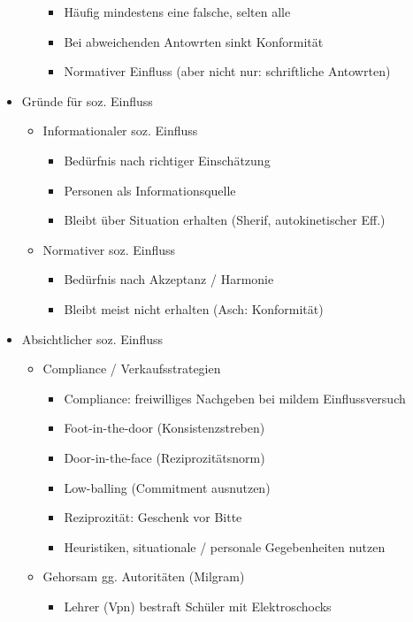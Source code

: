 \documentclass[11pt, paper=a4, twocolumn]{scrartcl}
\begin{document}
\begin{itemize}
\begin{itemize}
\begin{itemize}
							\item Häufig mindestens eine falsche, selten alle
							\item Bei abweichenden Antowrten sinkt Konformität
							\item Normativer Einfluss (aber nicht nur: schriftliche Antowrten)
						\end{itemize}
				\end{itemize}
			\item Gründe für soz. Einfluss
				\begin{itemize}
					\item Informationaler soz. Einfluss
						\begin{itemize}
							\item Bedürfnis nach richtiger Einschätzung
							\item Personen als Informationsquelle
							\item Bleibt über Situation erhalten (Sherif, autokinetischer Eff.)
						\end{itemize}
					\item Normativer soz. Einfluss
						\begin{itemize}
							\item Bedürfnis nach Akzeptanz / Harmonie
							\item Bleibt meist nicht erhalten (Asch: Konformität)
						\end{itemize}
				\end{itemize}
			\item Absichtlicher soz. Einfluss
				\begin{itemize}
					\item Compliance / Verkaufsstrategien
						\begin{itemize}
							\item Compliance: freiwilliges Nachgeben bei mildem Einflussversuch
							\item Foot-in-the-door (Konsistenzstreben)
							\item Door-in-the-face (Reziprozitätsnorm)
							\item Low-balling (Commitment ausnutzen)
							\item Reziprozität: Geschenk vor Bitte
							\item Heuristiken, situationale / personale Gegebenheiten nutzen
						\end{itemize}
					\item Gehorsam gg. Autoritäten (Milgram)
						\begin{itemize}
							\item Lehrer (Vpn) bestraft Schüler mit Elektroschocks

\end{itemize}
\end{itemize}
\end{itemize}
\end{document}
